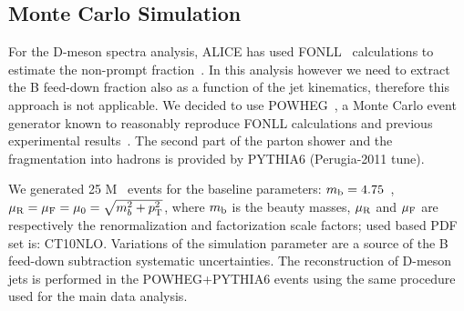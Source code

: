 \subsection{Monte Carlo Simulation}

For the D-meson spectra analysis, ALICE has used FONLL~\cite{Cacciari:1998} calculations to estimate the non-prompt fraction~\cite{ALICE:2011aa, ALICE:2014d, ALICE:2016a}.
In this analysis however we need to extract the B feed-down fraction also as a function of the jet kinematics, therefore this approach is not applicable.
We decided to use POWHEG~\cite{Alioli:2010}, a Monte Carlo event generator known to reasonably reproduce FONLL calculations and previous experimental results~\cite{Cacciari:2012b}.
The second part of the parton shower and the fragmentation into hadrons is provided by PYTHIA6 (Perugia-2011 tune).

We generated 25 M \bbbar\ events for the baseline parameters: 
$m_{\rm b} = 4.75$~\GeVcsq, $\mu_{\rm R} = \mu_{\rm F} =\mu_{0} = \sqrt{m_b^2+p_{\rm T}^2}$,
where $m_{\rm b}$ is the beauty masses, $\mu_{\rm R}$ and $\mu_{\rm F}$ are respectively the renormalization and factorization scale factors; used based PDF set is: CT10NLO.
Variations of the simulation parameter are a source of the B feed-down subtraction systematic uncertainties.
The reconstruction of D-meson jets is performed in the POWHEG+PYTHIA6 events using the same procedure used for the main data analysis.


